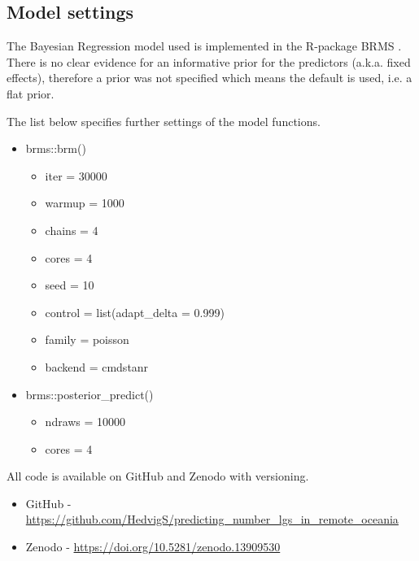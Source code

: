 \documentclass[unnumsec,webpdf,modern,medium]{oup-authoring-template}
\begin{document}
\subsection{Model settings}
\label{appendix_model_settings}
The Bayesian Regression model used is implemented in the R-package BRMS \citep{burkner2017brms}. There is no clear evidence for an informative prior for the predictors (a.k.a. fixed effects), therefore a prior was not specified which means the default is used, i.e. a flat prior.

The list below specifies further settings of the model functions.

\begin{itemize}
    \item brms::brm()
    \begin{itemize}
    \item  iter = 30000
    \item  warmup = 1000
    \item  chains = 4
    \item  cores = 4
    \item  seed = 10
    \item  control = list(adapt\_delta = 0.999)
    \item family = poisson
    \item backend = cmdstanr
    \end{itemize}
    \item brms::posterior\_predict()
    \begin{itemize}
    \item  ndraws = 10000
    \item  cores = 4
    \end{itemize}
\end{itemize}

All code is available on GitHub and Zenodo with versioning.

\begin{itemize}
    \item GitHub - \url{https://github.com/HedvigS/predicting_number_lgs_in_remote_oceania}
    \item Zenodo - \url{https://doi.org/10.5281/zenodo.13909530}
\end{itemize}


\end{document}
